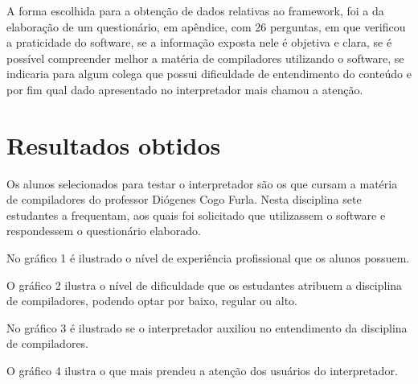 \documentclass[12pt,oneside,a4paper,chapter=TITLE,section=TITLE,sumario=tradicional]{abntex2}
\begin{document}
A forma escolhida para a obtenção de dados relativas ao framework, foi a da elaboração de um questionário, em apêndice, com 26 perguntas, em que verificou a praticidade do software, se a informação exposta nele é objetiva e clara, se é possível compreender melhor a matéria de compiladores utilizando o software, se indicaria para algum colega que possui dificuldade de entendimento do conteúdo e por fim qual dado apresentado no interpretador mais chamou a atenção.

\section{Resultados obtidos}
\label{sec:resultados}

Os alunos selecionados para testar o interpretador são os que cursam a matéria de compiladores do professor Diógenes Cogo Furla. Nesta disciplina sete estudantes a frequentam, aos quais foi solicitado que utilizassem o software e respondessem o questionário elaborado.

No gráfico 1 é ilustrado o nível de experiência profissional que os alunos possuem.

\begin{grafico}[H]
\end{grafico}

O gráfico 2 ilustra o nível de dificuldade que os estudantes atribuem a disciplina de compiladores, podendo optar por baixo, regular ou alto.

\begin{grafico}[H]
\end{grafico}

No gráfico 3 é ilustrado se o interpretador auxiliou no entendimento da disciplina de compiladores.

\begin{grafico}[H]
\end{grafico}

O gráfico 4 ilustra o que mais prendeu a atenção dos usuários do interpretador.

\begin{grafico}[H]
\end{grafico}
\end{document}
